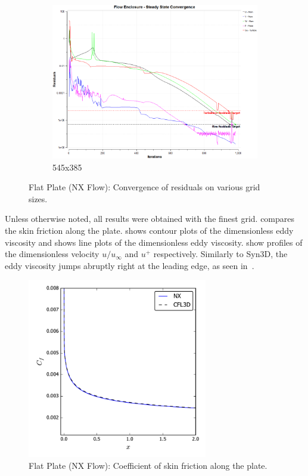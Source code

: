 \begin{figure}[ht!]
\begin{subfigure}{0.48\textwidth}
        \includegraphics[width=\textwidth]{./figs/flatnx/545x385_conv.png}
        \caption{545x385}
    \end{subfigure}
    \caption{Flat Plate (NX Flow): Convergence of residuals on various grid sizes.}
    \label{fig:nxflatcnvstudy}
\end{figure}

Unless otherwise noted, all results were obtained with the finest grid.  compares the skin friction along the plate.  shows contour plots of the dimensionless eddy viscosity and  shows line plots of the dimensionless eddy viscosity.  show profiles of the dimensionless velocity $u/u_\infty$ and $u^+$ respectively. Similarly to Syn3D, the eddy viscosity jumps abruptly right at the leading edge, as seen in~. 
\begin{figure}[ht!]
\centering
	\includegraphics[width=0.7\textwidth]{figs/flatnx/cf.pdf}
    \caption{Flat Plate (NX Flow): Coefficient of skin friction along the plate.}
    \label{fig:nxflatcf}
\end{figure}

